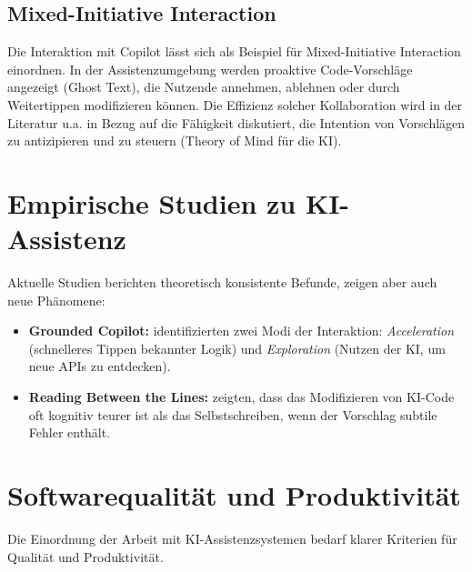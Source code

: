 \subsection{Mixed-Initiative Interaction}
Die Interaktion mit Copilot lässt sich als Beispiel für Mixed-Initiative Interaction \parencite{horvitz1999mixed} einordnen. In der Assistenzumgebung werden proaktive Code-Vorschläge angezeigt (Ghost Text), die Nutzende annehmen, ablehnen oder durch Weitertippen modifizieren können. Die Effizienz solcher Kollaboration wird in der Literatur u.a. in Bezug auf die Fähigkeit diskutiert, die Intention von Vorschlägen zu antizipieren und zu steuern (Theory of Mind für die KI).

\section{Empirische Studien zu KI-Assistenz}
Aktuelle Studien berichten theoretisch konsistente Befunde, zeigen aber auch neue Phänomene:
\begin{itemize}
    \item  \textbf{Grounded Copilot:} \textcite{barke2023grounded} identifizierten zwei Modi der Interaktion: \emph{Acceleration} (schnelleres Tippen bekannter Logik) und \emph{Exploration} (Nutzen der KI, um neue APIs zu entdecken).
    \item  \textbf{Reading Between the Lines:} \textcite{mozannar2022reading} zeigten, dass das Modifizieren von KI-Code oft kognitiv teurer ist als das Selbstschreiben, wenn der Vorschlag subtile Fehler enthält.
\end{itemize}

\section{Softwarequalität und Produktivität}
\label{sec:quality-productivity}

Die Einordnung der Arbeit mit KI-Assistenzsystemen bedarf klarer Kriterien für Qualität und Produktivität.

